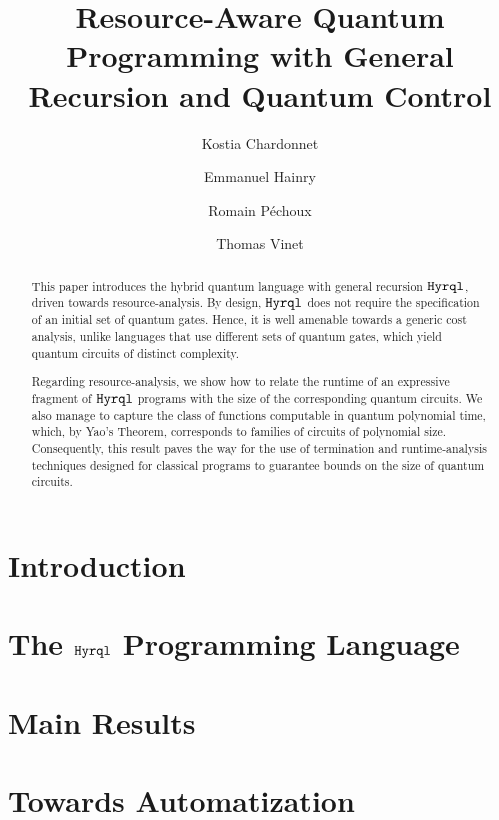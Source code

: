 \documentclass[a4paper,cleveref, autoref, thm-restate]{lipics-v2021}
\title{Resource-Aware Quantum Programming with General
Recursion and Quantum Control}
\author{Kostia Chardonnet}{Université de Lorraine, CNRS, Inria, LORIA, F-54000 Nancy, France}{kostia.chardonnet@inria.fr}{0009-0000-0671-6390}{}
\author{Emmanuel Hainry}{Université de Lorraine, CNRS, Inria, LORIA, F-54000 Nancy, France}{emmanuel.hainry@loria.fr}{0000-0002-9750-0460}{}
\author{Romain Péchoux}{Université de Lorraine, CNRS, Inria, LORIA, F-54000 Nancy, France}{romain.pechoux@loria.fr}{0000-0003-0601-5425}{}
\author{Thomas Vinet}{Université de Lorraine, CNRS, Inria, LORIA, F-54000 Nancy, France}{thomas.vinet@inria.fr}{0009-0007-8547-6145}{}
\newcommand{\hyrql}{{{\tt{Hyrql}}}}
\begin{document}
\maketitle

\begin{abstract}
This paper introduces the hybrid quantum language with general recursion
$\hyrql$, driven towards resource-analysis. By design, $\hyrql$ does not
require the specification of an initial set of quantum gates. Hence, it  is
well amenable towards a generic cost analysis, unlike languages that use
different sets of quantum gates, which yield quantum circuits of distinct
complexity.

Regarding resource-analysis, we show how to relate the runtime of an expressive
fragment of $\hyrql$ programs with the size of the corresponding quantum
circuits. We also manage to capture the class of functions computable in
quantum polynomial time, which, by Yao's Theorem, corresponds to families of
circuits of polynomial size. Consequently, this result paves the way for the
use of termination and runtime-analysis techniques designed for classical
programs to guarantee bounds on the size of quantum circuits.
\end{abstract}

\section{Introduction}
\label{sec:intro}

\section{The $\hyrql$ Programming Language}
\label{sec:language}


\section{Main Results}
\label{sec:results}


\section{Towards Automatization}
\label{sec:automatization}




\appendix

\end{document}
